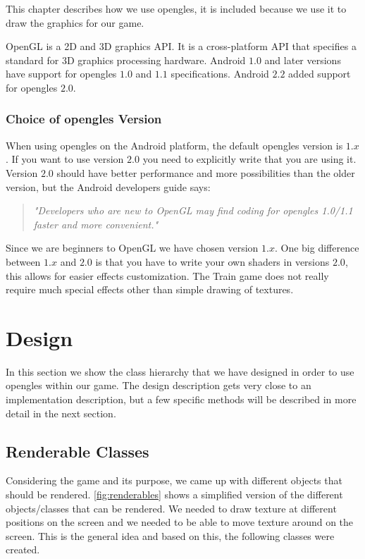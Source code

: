 This chapter describes how we use \ac{opengles}, it is included because we use it to draw the graphics for our game.

OpenGL is a 2D and 3D graphics API. It is a cross-platform API that specifies a standard for 3D graphics processing hardware. Android $1.0$ and later versions have support for \ac{opengles} $1.0$ and $1.1$ specifications. Android $2.2$ added support for \ac{opengles} $2.0$. \citep{androidopengl, khronosopengles}

\subsubsection*{Choice of \ac{opengles} Version}
When using \ac{opengles} on the Android platform, the default \ac{opengles} version is $1.x$. If you want to use version $2.0$ you need to explicitly write that you are using it. Version $2.0$ should have better performance and more possibilities than the older version, but the Android developers guide says:
\begin{quote}
\textit{"Developers who are new to OpenGL may find coding for \ac{opengles} 1.0/1.1 faster and more convenient."} \citep{androidopengl}
\end{quote}
Since we are beginners to OpenGL we have chosen version $1.x$. One big difference between $1.x$ and $2.0$ is that you have to write your own shaders in versions $2.0$, this allows for easier effects customization. The Train game does not really require much special effects other than simple drawing of textures.

\section{Design}

In this section we show the class hierarchy that we have designed in order to use \ac{opengles} within our game. The design description gets very close to an implementation description, but a few specific methods will be described in more detail in the next section.

\subsection{Renderable Classes}

Considering the game and its purpose, we came up with different objects that should be rendered. \autoref{fig:renderables} shows a simplified version of the different objects/classes that can be rendered. We needed to draw texture at different positions on the screen and we needed to be able to move texture around on the screen. This is the general idea and based on this, the following classes were created.

